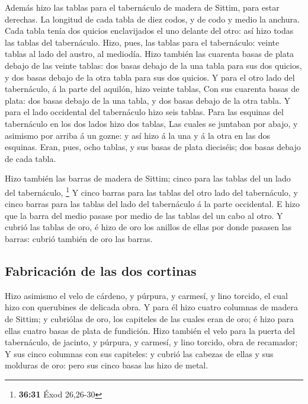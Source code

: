  Además hizo las tablas para el tabernáculo de madera de
Sittim, para estar derechas.  La longitud de cada tabla
de diez codos, y de codo y medio la anchura.  Cada tabla
tenía dos quicios enclavijados el uno delante del otro: así hizo todas
las tablas del tabernáculo.  Hizo, pues, las tablas para
el tabernáculo: veinte tablas al lado del austro, al mediodía.
 Hizo también las cuarenta basas de plata debajo de las
veinte tablas: dos basas debajo de la una tabla para sus dos quicios, y
dos basas debajo de la otra tabla para sus dos quicios. 
Y para el otro lado del tabernáculo, á la parte del aquilón, hizo veinte
tablas,  Con sus cuarenta basas de plata: dos basas
debajo de la una tabla, y dos basas debajo de la otra tabla.
 Y para el lado occidental del tabernáculo hizo seis
tablas.  Para las esquinas del tabernáculo en los dos
lados hizo dos tablas,  Las cuales se juntaban por abajo,
y asimismo por arriba á un gozne: y así hizo á la una y á la otra en las
dos esquinas.  Eran, pues, ocho tablas, y sus basas de
plata dieciséis; dos basas debajo de cada tabla.

 Hizo también las barras de madera de Sittim; cinco para
las tablas del un lado del tabernáculo, \footnote{\textbf{36:31} Éxod
  26,26-30}  Y cinco barras para las tablas del otro lado
del tabernáculo, y cinco barras para las tablas del lado del tabernáculo
á la parte occidental.  E hizo que la barra del medio
pasase por medio de las tablas del un cabo al otro.  Y
cubrió las tablas de oro, é hizo de oro los anillos de ellas por donde
pasasen las barras: cubrió también de oro las barras.

\hypertarget{fabricaciuxf3n-de-las-dos-cortinas}{%
\subsection{Fabricación de las dos
cortinas}\label{fabricaciuxf3n-de-las-dos-cortinas}}

 Hizo asimismo el velo de cárdeno, y púrpura, y carmesí,
y lino torcido, el cual hizo con querubines de delicada obra.
 Y para él hizo cuatro columnas de madera de Sittim; y
cubriólas de oro, los capiteles de las cuales eran de oro; é hizo para
ellas cuatro basas de plata de fundición.  Hizo también
el velo para la puerta del tabernáculo, de jacinto, y púrpura, y
carmesí, y lino torcido, obra de recamador;  Y sus cinco
columnas con sus capiteles: y cubrió las cabezas de ellas y sus molduras
de oro: pero sus cinco basas las hizo de metal.

